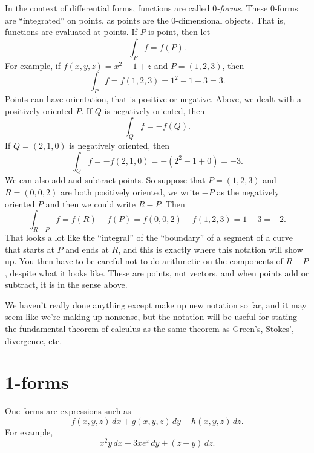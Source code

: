 \documentclass[12pt]{article}
\begin{document}
In the context of differential forms,
functions are called \emph{$0$-forms}.  These $0$-forms are ``integrated''
on points, as points are the $0$-dimensional objects.
That is, functions are evaluated at points.  If $P$ is point, then let
\[
\int_P f = f(P) .
\]
For example,
if $f(x,y,z) = x^2-1+z$ and $P=(1,2,3)$, then
\[
\int_P f = f(1,2,3) = 1^2-1+3 =3 .
\]
Points can have orientation, that is positive or negative.  Above, we dealt
with a positively oriented $P$.  If $Q$ is negatively oriented, then 
\[
\int_Q f = -f(Q).
\]
If $Q = (2,1,0)$ is negatively oriented, then
\[
\int_Q f = -f(2,1,0) = -( 2^2-1+0 ) = -3.
\]
We can also add and subtract points.  So suppose that $P=(1,2,3)$ and
$R = (0,0,2)$ are both positively oriented, we write $-P$ as the negatively
oriented $P$ and then we could write $R-P$.  Then
\[
\int_{R-P} f = f(R)-f(P) = f(0,0,2)-f(1,2,3) = 1-3 = -2.
\]
That looks a lot like the ``integral'' of the ``boundary'' of a segment of
a curve that starts at $P$ and ends at $R$, and this is exactly where this
notation will show up.
You then have to be careful
not to do arithmetic on the components of $R-P$, despite what it looks like.
These are points, not vectors, and when points add or subtract, it is in the
sense above.

We haven't really done anything except make up new notation so far, and
it may seem like we're making up nonsense, but the notation will be useful for
stating the fundamental theorem of calculus as the same theorem as 
Green's, Stokes', divergence, etc.

\section*{1-forms}

One-forms are expressions such as
\[
f(x,y,z) \, dx + 
g(x,y,z) \, dy + 
h(x,y,z) \, dz .
\]
For example,
\[
x^2y \, dx + 
3xe^z \, dy + 
(z+y) \, dz .
\]
\end{document}

